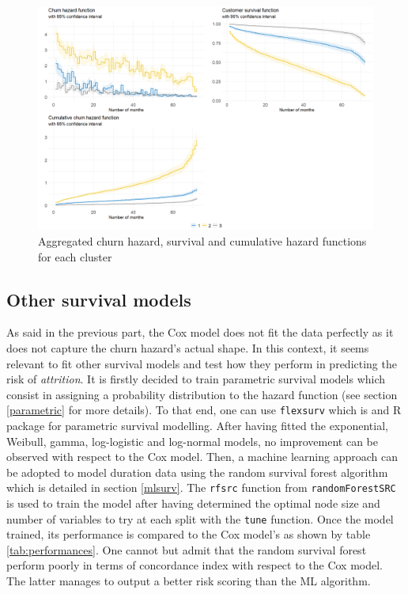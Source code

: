 \documentclass[
]{book}
\begin{document}
\begin{figure}

{\centering \includegraphics[width=20.83in]{./imgs/churn_surv_clust} 

}

\caption{Aggregated churn hazard, survival and cumulative hazard functions for each cluster}\label{fig:coxclust}
\end{figure}

\hypertarget{other-survival-models}{%
\subsection{Other survival models}\label{other-survival-models}}

As said in the previous part, the Cox model does not fit the data perfectly as it does not capture the churn hazard's actual shape. In this context, it seems relevant to fit other survival models and test how they perform in predicting the risk of \emph{attrition}. It is firstly decided to train parametric survival models which consist in assigning a probability distribution to the hazard function (see section \ref{parametric} for more details). To that end, one can use \texttt{flexsurv} \citep{flexsurv2016} which is and R package for parametric survival modelling. After having fitted the exponential, Weibull, gamma, log-logistic and log-normal models, no improvement can be observed with respect to the Cox model. Then, a machine learning approach can be adopted to model duration data using the random survival forest algorithm which is detailed in section \ref{mlsurv}. The \texttt{rfsrc} function from \texttt{randomForestSRC} \citep{randomForestSRC2008} is used to train the model after having determined the optimal node size and number of variables to try at each split with the \texttt{tune} function. Once the model trained, its performance is compared to the Cox model's as shown by table \ref{tab:performances}. One cannot but admit that the random survival forest perform poorly in terms of concordance index with respect to the Cox model. The latter manages to output a better risk scoring than the ML algorithm.
\end{document}
